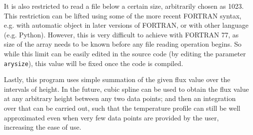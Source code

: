 \documentclass[a4paper, 12pt]{article}
\begin{document}
It is also restricted to read a file below a certain size, arbitrarily chosen as 1023. This restriction can be lifted using some of the more recent FORTRAN syntax, e.g. with automatic object in later versions of FORTRAN, or with other language (e.g. Python). However, this is very difficult to achieve with FORTRAN 77, as size of the array needs to be known before any file reading operation begins. So while this limit can be easily edited in the source code (by editing the parameter \texttt{arysize}), this value will be fixed once the code is compiled.
\cite{AutoObj}

Lastly, this program uses simple summation of the given flux value over the intervals of height. In the future, cubic spline can be used to obtain the flux value at any arbitrary height between any two data points; and then an integration over that can be carried out, such that the temperature profile can still be well approximated even when very few data points are provided by the user, increasing the ease of use.
\end{document}
